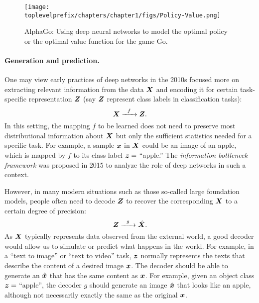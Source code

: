 \documentclass[\toplevelprefix/book-main.tex]{subfiles}
\begin{document}
\begin{figure}
    \centering
    \texttt{[image: \\toplevelprefix/chapters/chapter1/figs/Policy-Value.png]}
    \caption{AlphaGo: Using deep neural networks to model the optimal policy or the optimal value function for the game Go. }
    \label{fig:Alpha-Go}
\end{figure}

\paragraph{Generation and prediction.}
One may view early practices of deep networks in the 2010s focused more on extracting relevant information from the data $\bm{X}$ and encoding it for certain task-specific representation $\bm{Z}$ (say $\bm{Z}$ represent class labels in classification tasks):
\begin{equation}
    \bm{X}   \xrightarrow{\hspace{2mm} f \hspace{2mm}} \bm{Z}.
       \label{eqn:encoding-deep-networks}
\end{equation}
In this setting, the mapping $f$ to be learned does not need to preserve most  distributional information about $\bm{X}$ but only the sufficient statistics needed for a specific task. For example, a sample $\bm{x}$ in $\bm{X}$ could be an image of an apple, which is mapped by $f$ to its class label $\bm{z} =$ ``apple.'' The {\em information bottleneck framework} \cite{Tishby-ITW2015} was proposed in 2015 to analyze the role of deep networks in such a context.
 
However, in many modern situations such as those so-called large foundation models,  people often need to decode $\bm{Z}$ to recover the corresponding $\bm{X}$ to a certain degree of precision:
\begin{equation}
    \bm{Z}   \xrightarrow{\hspace{2mm} g  \hspace{2mm}} \hat {\bm{X}}.
       \label{eqn:decoding-deep-networks}
\end{equation}
As $\bm{X}$ typically represents data observed from the external world, a good decoder would allow us to simulate or predict what happens in the world. For example, in a ``text to image'' or ``text to video'' task, $\bm{z}$ normally represents the texts that describe the content of a desired image $\bm{x}$. The decoder should be able to generate an $\hat {\bm{x}}$ that has the same content as $\bm{x}$. For example, given an object class $\bm{z} = $ ``apple'', the decoder $g$ should generate an image $\hat {\bm{x}}$ that looks like an apple, although not necessarily exactly the same as the original $\bm{x}$. 
\end{document}

